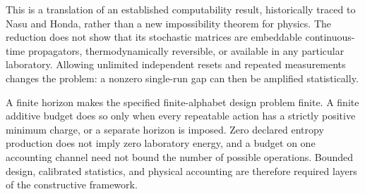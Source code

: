 This is a translation of an established computability result, historically
traced to Nasu and Honda, rather than a new impossibility theorem for
physics. The reduction does not show that its stochastic matrices are
embeddable continuous-time propagators, thermodynamically reversible, or
available in any particular laboratory. Allowing unlimited independent
resets and repeated measurements changes the problem: a nonzero single-run
gap can then be amplified statistically.

A finite horizon makes the specified finite-alphabet design problem
finite. A finite additive budget does so only when every repeatable action
has a strictly positive minimum charge, or a separate horizon is imposed.
Zero declared entropy production does not imply zero laboratory energy,
and a budget on one accounting channel need not bound the number of
possible operations. Bounded design, calibrated statistics, and physical
accounting are therefore required layers of the constructive framework.
